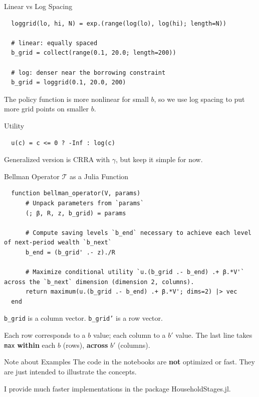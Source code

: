 \documentclass[10pt,aspectratio=169]{beamer}
\begin{document}
\begin{frame}[fragile]{Linear vs Log Spacing}
  \begin{lstlisting}
  loggrid(lo, hi, N) = exp.(range(log(lo), log(hi); length=N))

  # linear: equally spaced
  b_grid = collect(range(0.1, 20.0; length=200))

  # log: denser near the borrowing constraint
  b_grid = loggrid(0.1, 20.0, 200)
  \end{lstlisting}
  The policy function is more nonlinear for small $b$, so we use log spacing to put more grid points on smaller $b$.
\end{frame}

\begin{frame}[fragile]{Utility}
  \begin{lstlisting}
  u(c) = c <= 0 ? -Inf : log(c)
  \end{lstlisting}
  Generalized version is CRRA with $\gamma$, but keep it simple for now.
\end{frame}

\begin{frame}[fragile]{Bellman Operator $\mathcal{T}$ as a Julia Function}
  \begin{lstlisting}
  function bellman_operator(V, params)
      # Unpack parameters from `params`
      (; β, R, z, b_grid) = params

      # Compute saving levels `b_end` necessary to achieve each level of next-period wealth `b_next`
      b_end = (b_grid' .- z)./R

      # Maximize conditional utility `u.(b_grid .- b_end) .+ β.*V'` across the `b_next` dimension (dimension 2, columns).
      return maximum(u.(b_grid .- b_end) .+ β.*V'; dims=2) |> vec
  end
  \end{lstlisting}
  \texttt{b\_grid} is a column vector. \texttt{b\_grid'} is a row vector.
  
  Each row corresponds to a $b$ value; each column to a $b'$ value. The last line takes \texttt{max} \textbf{within} each $b$ (rows), \textbf{across} $b'$ (columns).
\end{frame}

\begin{frame}{Note about Examples}
  The code in the notebooks are \textbf{not} optimized or fast. They are just intended to illustrate the concepts.

  I provide much faster implementations in the package HouseholdStages.jl.
\end{frame}
\end{document}
